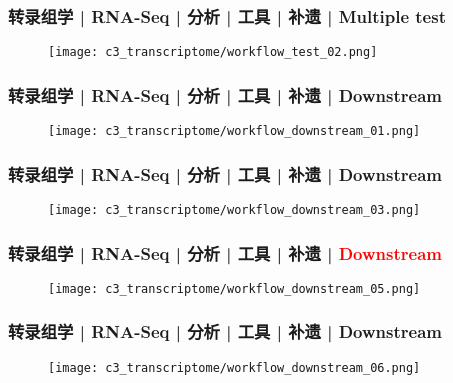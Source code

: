 \begin{frame}
  \frametitle{转录组学 | RNA-Seq | 分析 | 工具 | 补遗 | Multiple test}
  \begin{figure}
    \centering
    \texttt{[image: c3\_transcriptome/workflow\_test\_02.png]}
  \end{figure}
\end{frame}

\begin{frame}
  \frametitle{转录组学 | RNA-Seq | 分析 | 工具 | 补遗 | Downstream}
  \begin{figure}
    \centering
    \texttt{[image: c3\_transcriptome/workflow\_downstream\_01.png]}
  \end{figure}
\end{frame}

\begin{frame}
  \frametitle{转录组学 | RNA-Seq | 分析 | 工具 | 补遗 | Downstream}
  \begin{figure}
    \centering
    \texttt{[image: c3\_transcriptome/workflow\_downstream\_03.png]}
  \end{figure}
\end{frame}

\begin{frame}
  \frametitle{转录组学 | RNA-Seq | 分析 | 工具 | 补遗 | \textcolor{red}{Downstream}}
  \begin{figure}
    \centering
    \texttt{[image: c3\_transcriptome/workflow\_downstream\_05.png]}
  \end{figure}
\end{frame}

\begin{frame}
  \frametitle{转录组学 | RNA-Seq | 分析 | 工具 | 补遗 | Downstream}
  \begin{figure}
    \centering
    \texttt{[image: c3\_transcriptome/workflow\_downstream\_06.png]}
  \end{figure}
\end{frame}

